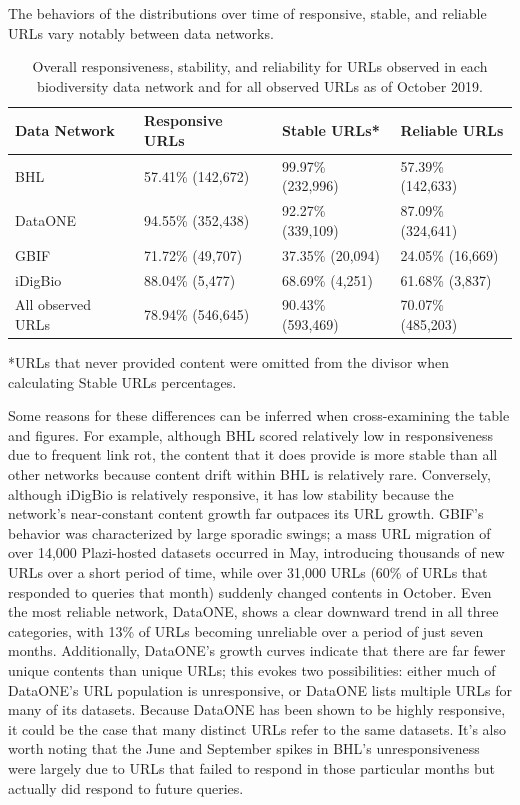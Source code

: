 \documentclass[10pt,letterpaper]{article}
\begin{document}
The behaviors of the distributions over time of responsive, stable, and reliable URLs vary notably between data networks. 

\begin{table}[!ht]
\begin{adjustwidth}{-1.5in}{0in} %
\centering
\caption{Overall responsiveness, stability, and reliability for URLs observed in each biodiversity data network and for all observed URLs as of October 2019.
}
\begin{tabular}{|l|l|l|l|}
\hline
{\bf Data Network} & {\bf Responsive URLs} & {\bf Stable URLs*} & {\bf Reliable URLs} \\ \hline
BHL & 57.41\% (142,672) & 99.97\% (232,996) & 57.39\% (142,633) \\ \hline
DataONE & 94.55\% (352,438) & 92.27\% (339,109) & 87.09\% (324,641) \\ \hline
GBIF & 71.72\% (49,707) & 37.35\% (20,094) & 24.05\% (16,669) \\ \hline
iDigBio & 88.04\% (5,477) & 68.69\% (4,251) & 61.68\% (3,837)  \\ \hline
All observed URLs & 78.94\% (546,645) & 90.43\% (593,469) & 70.07\% (485,203) \\ \hline
\end{tabular}
\label{table1}
\end{adjustwidth}
\end{table}

*URLs that never provided content were omitted from the divisor when calculating Stable URLs percentages.

Some reasons for these differences can be inferred when cross-examining the table and figures. For example, although BHL scored relatively low in responsiveness due to frequent link rot, the content that it does provide is more stable than all other networks because content drift within BHL is relatively rare. Conversely, although iDigBio is relatively responsive, it has low stability because the network’s near-constant content growth far outpaces its URL growth. GBIF’s behavior was characterized by large sporadic swings; a mass URL migration of over 14,000 Plazi-hosted datasets occurred in May, introducing thousands of new URLs over a short period of time, while over 31,000 URLs (60\% of URLs that responded to queries that month) suddenly changed contents in October. Even the most reliable network, DataONE, shows a clear downward trend in all three categories, with 13\% of URLs becoming unreliable over a period of just seven months. Additionally, DataONE’s growth curves indicate that there are far fewer unique contents than unique URLs; this evokes two possibilities: either much of DataONE’s URL population is unresponsive, or DataONE lists multiple URLs for many of its datasets. Because DataONE has been shown to be highly responsive, it could be the case that many distinct URLs refer to the same datasets. It’s also worth noting that the June and September spikes in BHL’s unresponsiveness were largely due to URLs that failed to respond in those particular months but actually did respond to future queries.
\end{document}
